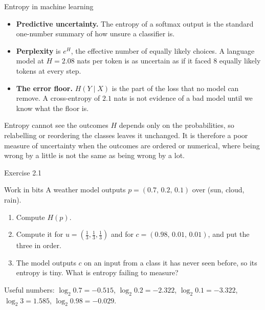 \documentclass[aspectratio=169,9pt]{beamer}
\newcommand{\orange}[1]{\textcolor{AmazonOrange}{\textbf{#1}}}
\newcommand{\muted}[1]{\textcolor{EPICMuted}{#1}}
\begin{document}
\begin{frame}{Entropy in machine learning}
\begin{itemize}
    \item \orange{Predictive uncertainty.} The entropy of a softmax output is the standard one-number summary
    of how unsure a classifier is.
    \pause
    \item \orange{Perplexity} is $e^{H}$, the effective number of equally likely choices. A language model at
    $H = 2.08$ nats per token is as uncertain as if it faced $8$ equally likely tokens at every step.
    \pause
    \item \orange{The error floor.} $H(Y \mid X)$ is the part of the loss that no model can remove. A
    cross-entropy of $2.1$ nats is not evidence of a bad model until we know what the floor is.
\end{itemize}
\vspace{0.25cm}
\pause
\begin{alertblock}{Entropy cannot see the outcomes}
$H$ depends only on the probabilities, so relabelling or reordering the classes leaves it unchanged. It is
therefore a poor measure of uncertainty when the outcomes are ordered or numerical, where being wrong by a
little is not the same as being wrong by a lot.
\end{alertblock}
\end{frame}

\begin{frame}{Exercise 2.1}
\begin{exampleblock}{Work in bits}
A weather model outputs $p = (0.7,\, 0.2,\, 0.1)$ over (sun, cloud, rain).
\vspace{0.15cm}
\begin{enumerate}
    \item Compute $H(p)$.
    \item Compute it for $u = (\tfrac13,\tfrac13,\tfrac13)$ and for $c = (0.98,\, 0.01,\, 0.01)$,
    and put the three in order.
    \item The model outputs $c$ on an input from a class it has never seen before, so its entropy is tiny.
    What is entropy failing to measure?
\end{enumerate}
\end{exampleblock}
\vspace{0.3cm}
\pause
\muted{Useful numbers: $\log_2 0.7 = -0.515$, $\log_2 0.2 = -2.322$, $\log_2 0.1 = -3.322$,
$\log_2 3 = 1.585$, $\log_2 0.98 = -0.029$.}
\end{frame}
\end{document}
